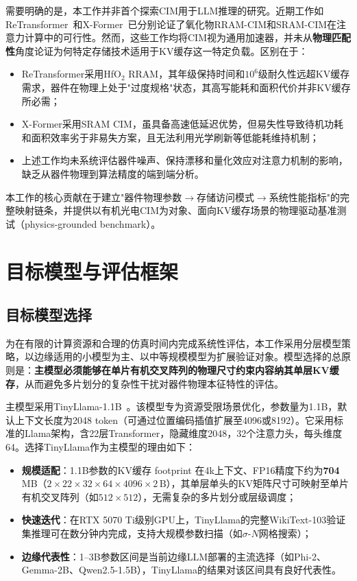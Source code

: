 需要明确的是，本工作并非首个探索CIM用于LLM推理的研究。近期工作如ReTransformer~\cite{huang2024retransformer}和X-Former~\cite{cho2024xformer}已分别论证了氧化物RRAM-CIM和SRAM-CIM在注意力计算中的可行性。然而，这些工作均将CIM视为通用加速器，并未从\textbf{物理匹配性}角度论证为何特定存储技术适用于KV缓存这一特定负载。区别在于：

\begin{itemize}
    \item ReTransformer采用HfO$_2$ RRAM，其年级保持时间和$10^6$级耐久性远超KV缓存需求，器件在物理上处于"过度规格"状态，其高写能耗和面积代价并非KV缓存所必需；
    \item X-Former采用SRAM CIM，虽具备高速低延迟优势，但易失性导致待机功耗和面积效率劣于非易失方案，且无法利用光学刷新等低能耗维持机制；
    \item 上述工作均未系统评估器件噪声、保持漂移和量化效应对注意力机制的影响，缺乏从器件物理到算法精度的端到端分析。
\end{itemize}

本工作的核心贡献在于建立"器件物理参数$\rightarrow$存储访问模式$\rightarrow$系统性能指标"的完整映射链条，并提供以有机光电CIM为对象、面向KV缓存场景的物理驱动基准测试（physics-grounded benchmark）。


\section{目标模型与评估框架}
\label{sec:work2_models}

\subsection{目标模型选择}

为在有限的计算资源和合理的仿真时间内完成系统性评估，本工作采用分层模型策略，以边缘适用的小模型为主、以中等规模模型为扩展验证对象。模型选择的总原则是：\textbf{主模型必须能够在单片有机交叉阵列的物理尺寸约束内容纳其单层KV缓存}，从而避免多片划分的复杂性干扰对器件物理本征特性的评估。

主模型采用TinyLlama-1.1B~\cite{zhang2024tinyllama}。该模型专为资源受限场景优化，参数量为1.1B，默认上下文长度为2048 token（可通过位置编码插值扩展至4096或8192）。它采用标准的Llama架构，含22层Transformer，隐藏维度2048，32个注意力头，每头维度64。选择TinyLlama作为主模型的理由如下：

\begin{itemize}
    \item \textbf{规模适配}：1.1B参数的KV缓存 footprint 在4k上下文、FP16精度下约为\textbf{704} MB（$2 \times 22 \times 32 \times 64 \times 4096 \times 2\,\text{B}$），其单层单头的KV矩阵尺寸可映射至单片有机交叉阵列（如$512 \times 512$），无需复杂的多片划分或层级调度；
    \item \textbf{快速迭代}：在RTX 5070 Ti级别GPU上，TinyLlama的完整WikiText-103验证集推理可在数分钟内完成，支持大规模参数扫描（如$\sigma$-$N$网格搜索）；
    \item \textbf{边缘代表性}：1–3B参数区间是当前边缘LLM部署的主流选择（如Phi-2、Gemma-2B、Qwen2.5-1.5B），TinyLlama的结果对该区间具有良好代表性。
\end{itemize}

